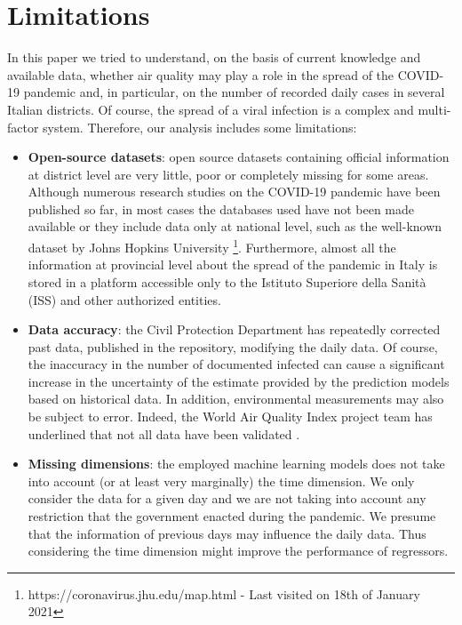 \documentclass[review]{elsarticle}
\begin{document}
\section{Limitations}
In this paper we tried to understand, on the basis of current knowledge and  available data, whether air quality may play a role in the spread of the COVID-19 pandemic and, in particular, on the number of recorded daily cases in several Italian districts. Of course, the spread of a viral infection is a complex and multi-factor system. Therefore, our analysis includes some limitations:
\begin{itemize}
    \item \textbf{Open-source datasets}: open source datasets containing official information at district level are very little, poor or completely missing for some areas. Although numerous research studies on the COVID-19 pandemic have been published so far, in most cases the databases used have not been made available or they include data only at national level, such as the well-known dataset by Johns Hopkins University \footnote{https://coronavirus.jhu.edu/map.html - Last visited on 18th of January 2021 }. Furthermore, almost all the information at provincial level about the spread of the pandemic in Italy is stored in a platform accessible only to the Istituto Superiore della Sanità (ISS) and other authorized entities.

    \item \textbf{Data accuracy}: the Civil Protection Department has repeatedly corrected past data, published in the repository, modifying the daily data. Of course, the inaccuracy in the number of documented infected can cause a significant increase in the uncertainty of the estimate provided by the prediction models based on historical data. In addition, environmental measurements may also be subject to error. Indeed, the World Air Quality Index project team has underlined that not all data have been validated \cite{world2020air}.
    
    \item \textbf{Missing dimensions}: the employed machine learning models does not take into account (or at least very marginally) the time dimension. We only consider the data for a given day and we are not taking into account any restriction that the government enacted during the pandemic. We presume that the information of previous days may influence the daily data. Thus considering the time dimension might improve the performance of regressors.
    

\end{itemize}
\end{document}
